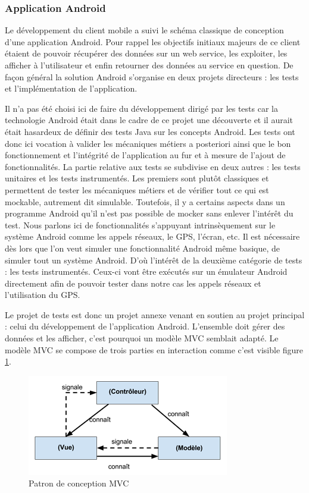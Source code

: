 \subsubsection{Application Android}

Le développement du client mobile a suivi le schéma classique de conception d’une application Android. Pour rappel les objectifs initiaux majeurs de ce client étaient de pouvoir récupérer des données sur un web service, les exploiter, les afficher à l’utilisateur et enfin retourner des données au service en question. De façon général la solution Android s’organise en deux projets directeurs : les tests et l’implémentation de l’application.

Il n’a pas été choisi ici de faire du développement dirigé par les tests car la technologie Android était dans le cadre de ce projet une découverte et il aurait était hasardeux de définir des tests Java sur les concepts Android. Les tests ont donc ici vocation à valider les mécaniques métiers a posteriori ainsi que le bon fonctionnement et l’intégrité de l’application au fur et à mesure de l’ajout de fonctionnalités. La partie relative aux tests se subdivise en deux autres : les tests unitaires et les tests instrumentés. Les premiers sont plutôt classiques et permettent de tester les mécaniques métiers et de vérifier tout ce qui est mockable, autrement dit simulable. Toutefois, il y a certains aspects dans un programme Android qu’il n’est pas possible de mocker sans enlever l’intérêt du test. Nous parlons ici de fonctionnalités s’appuyant intrinsèquement sur le système Android comme les appels réseaux, le GPS, l’écran, etc. Il est nécessaire dès lors que l’on veut simuler une fonctionnalité Android même basique, de simuler tout un système Android. D’où l’intérêt de la deuxième catégorie de tests : les tests instrumentés. Ceux-ci vont être exécutés sur un émulateur Android directement afin de pouvoir tester dans notre cas les appels réseaux et l’utilisation du GPS.

Le projet de tests est donc un projet annexe venant en soutien au projet principal : celui du développement de l’application Android. L’ensemble doit gérer des données et les afficher, c’est pourquoi un modèle MVC semblait adapté. Le modèle MVC se compose de trois parties en interaction comme c’est visible figure \ref{mvc}.

\begin{figure}[H]
    \centering
    \includegraphics[width=\textwidth]{./img/mvc.png}
    \caption{Patron de conception MVC}
    \label{mvc}
\end{figure}

